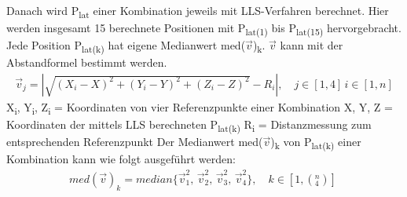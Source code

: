 Danach wird P\textsubscript{lat} einer Kombination jeweils mit LLS-Verfahren berechnet. Hier werden insgesamt 15 berechnete Positionen mit P\textsubscript{lat(1)} bis P\textsubscript{lat(15)} hervorgebracht. Jede Position P\textsubscript{lat(k)} hat eigene Medianwert med($\vec{v}$)\textsubscript{k}. $\vec{v}$ kann mit der Abstandformel bestimmt werden.
\begin{align}
\vec{v}_{j}=|\sqrt{(X_{i}-X)^2+(Y_{i}-Y)^2+(Z_{i}-Z)^2}-R_{i}|,
\quad j \in[1,4] \,i\in[1,n]
\end{align}
X\textsubscript{i}, Y\textsubscript{i}, Z\textsubscript{i} = Koordinaten von vier Referenzpunkte einer Kombination
\newline
X, Y, Z = Koordinaten der mittels LLS berechneten P\textsubscript{lat(k)}
\newline
R\textsubscript{i} = Distanzmessung zum entsprechenden Referenzpunkt
\newline
\newline
Der Medianwert med($\vec{v}$)\textsubscript{k} von P\textsubscript{lat(k)} einer Kombination kann wie folgt ausgeführt werden:
\begin{align}
med(\vec{v})_k = median\{\vec{v}^2_1,\, \vec{v}^2_2,\, \vec{v}^2_3, \, \vec{v}^2_4\}, \quad k \in[1,(^{n}_{4})]\
\end{align}



